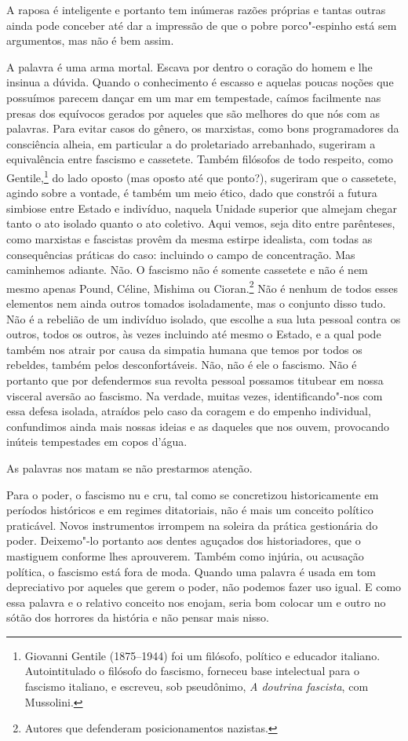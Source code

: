 A raposa é inteligente e portanto tem inúmeras razões próprias e tantas
outras ainda pode conceber até dar a impressão de que o pobre
porco"-espinho está sem argumentos, mas não é bem assim.

A palavra é uma arma mortal. Escava por dentro o coração do homem e lhe
insinua a dúvida. Quando o conhecimento é escasso e aquelas poucas
noções que possuímos parecem dançar em um mar em tempestade, caímos
facilmente nas presas dos equívocos gerados por aqueles que são melhores
do que nós com as palavras. Para evitar casos do gênero, os marxistas,
como bons programadores da consciência alheia, em particular a do
proletariado arrebanhado, sugeriram a equivalência entre fascismo e
cassetete. Também filósofos de todo respeito, como Gentile,\footnote{Giovanni Gentile (1875--1944) foi um filósofo, político e educador
  italiano. Autointitulado o filósofo do fascismo, forneceu base
  intelectual para o fascismo italiano, e escreveu, sob pseudônimo,
  \emph{A doutrina fascista}, com Mussolini.} do lado oposto (mas oposto até que ponto?), sugeriram
que o cassetete, agindo sobre a vontade, é também um meio ético, dado
que constrói a futura simbiose entre Estado e indivíduo, naquela Unidade
superior que almejam chegar tanto o ato isolado quanto o ato coletivo.
Aqui vemos, seja dito entre parênteses, como marxistas e fascistas
provêm da mesma estirpe idealista, com todas as consequências práticas
do caso: incluindo o campo de concentração. Mas caminhemos adiante. Não.
O fascismo não é somente cassetete e não é nem mesmo apenas Pound,
Céline, Mishima ou Cioran.\footnote{Autores que defenderam posicionamentos nazistas.} Não é nenhum de todos esses elementos nem ainda outros
tomados isoladamente, mas o conjunto disso tudo. Não é a rebelião de um
indivíduo isolado, que escolhe a sua luta pessoal contra os outros,
todos os outros, às vezes incluindo até mesmo o Estado, e a qual pode
também nos atrair por causa da simpatia humana que temos por todos os
rebeldes, também pelos desconfortáveis. Não, não é ele o fascismo. Não é
portanto que por defendermos sua revolta pessoal possamos titubear em
nossa visceral aversão ao fascismo. Na verdade, muitas vezes,
identificando"-nos com essa defesa isolada, atraídos pelo caso da coragem
e do empenho individual, confundimos ainda mais nossas ideias e as
daqueles que nos ouvem, provocando inúteis tempestades em copos d'água.

As palavras nos matam se não prestarmos atenção.

Para o poder, o fascismo nu e cru, tal como se concretizou
historicamente em períodos históricos e em regimes ditatoriais, não é
mais um conceito político praticável. Novos instrumentos irrompem na
soleira da prática gestionária do poder. Deixemo"-lo portanto aos dentes
aguçados dos historiadores, que o mastiguem conforme lhes aprouverem.
Também como injúria, ou acusação política, o fascismo está fora de moda.
Quando uma palavra é usada em tom depreciativo por aqueles que gerem o
poder, não podemos fazer uso igual. E como essa palavra e o relativo
conceito nos enojam, seria bom colocar um e outro no sótão dos horrores
da história e não pensar mais nisso.

